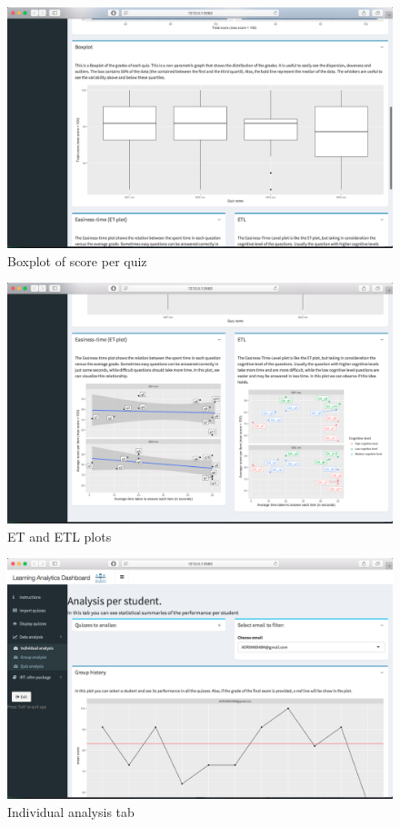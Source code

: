 \begin{figure}[ht!]
\centering
\includegraphics[width=\linewidth]{img/d_5_2.png}
\caption{Boxplot of score per quiz}
\label{img:d_5_2}
\end{figure}
\begin{figure}[ht!]
\centering
\includegraphics[width=\linewidth]{img/d_5_3.png}
\caption{ET and ETL plots}
\label{img:d_5_3}
\end{figure}
\begin{figure}[ht!]
\centering
\includegraphics[width=\linewidth]{img/d_6.png}
\caption{Individual analysis tab}
\label{img:d_6}
\end{figure}

